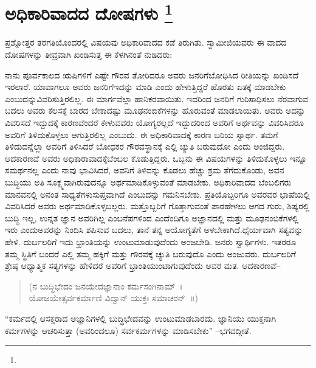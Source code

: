 
\chapter[ಅಧಿಕಾರಿವಾದದ ದೋಷಗಳು ]{ಅಧಿಕಾರಿವಾದದ ದೋಷಗಳು \protect\footnote{}}

ಪ್ರಶ್ನೋತ್ತರ ತರಗತಿಯೊಂದರಲ್ಲಿ ವಿಷಯವು ಅಧಿಕಾರಿವಾದದ ಕಡೆ ತಿರುಗಿತು. ಸ್ವಾಮೀಜಿಯವರು ಈ ವಾದದ ದೋಷಗಳನ್ನು ತೀವ್ರವಾಗಿ ಖಂಡಿಸುತ್ತ ಈ ಕೆಳಗಿನಂತೆ ನುಡಿದರು:

ನಾನು ಪೂರ್ವಕಾಲದ ಋಷಿಗಳಿಗೆ ಎಷ್ಟೇ ಗೌರವ ತೋರಿದರೂ ಅವರು ಜನರಿಗೆ\break ಬೋಧಿಸಿದ ರೀತಿಯನ್ನು ಖಂಡಿಸದೆ ಇರಲಾರೆ. ಯಾವಾಗಲೂ ಅವರು ಜನರಿಗೆ\break ಇದನ್ನು ಮಾಡಿ ಎಂದು ಹೇಳುತ್ತಿದ್ದರೆ ಹೊರತು ಏತಕ್ಕೆ ಮಾಡಬೇಕು ಎಂಬುದನ್ನು\break ವಿವರಿಸುತ್ತಿರಲಿಲ್ಲ. ಈ ಮಾರ್ಗವೆಲ್ಲಾ ಹಾನಿಕರವಾಯಿತು. ಇದರಿಂದ ಜನರಿಗೆ ಗುರಿ\break ಸಾಧಿಸಲು ನೆರವಾಗುವ ಬದಲು ಅವರು ಕೆಲಸಕ್ಕೆ ಬಾರದ ಬೇಕಾದಷ್ಟು ಮೂಢನಂಬಿಕೆಗಳನ್ನು ಹೊರುವಂತೆ ಮಾಡಲಾಯಿತು. ಅವರು ಅದನ್ನು ವಿವರಿಸದೆ ಇದ್ದುದಕ್ಕೆ ಕಾರಣವೆಂದರೆ ಕೇಳುವವರು ಯೋಗ್ಯರಲ್ಲದೆ ಇದ್ದುದರಿಂದ ಅವರಿಗೆ ಅರ್ಥವನ್ನು ವಿವರಿಸಿದರೂ ಅವರಿಗೆ ತಿಳಿದುಕೊಳ್ಳಲು ಆಗುತ್ತಿರಲಿಲ್ಲ ಎಂಬುದು. ಈ ಅಧಿಕಾರಿವಾದಕ್ಕೆ ಕಾರಣ ಬರಿಯ ಸ್ವಾರ್ಥ. ತಮಗೆ ತಿಳಿದುದನ್ನೆಲ್ಲಾ ಅವರಿಗೆ ತಿಳಿಸಿದರೆ ಬೋಧಕರ ಗೌರವಸ್ಥಾನಕ್ಕೆ ಎಲ್ಲಿ ಚ್ಯುತಿ ಬರುವುದೋ ಎಂದು ಅಂಜಿದ್ದರು. ಆದಕಾರಣವೆ ಅವರು ಅಧಿಕಾರಾವಾದಕ್ಕೆ\break ಬೆಂಬಲ ಕೊಡುತ್ತಿದ್ದರು. ಒಬ್ಬನು ಈ ವಿಷಯಗಳನ್ನು ತಿಳಿದುಕೊಳ್ಳಲು ಇನ್ನೂ ಸಮರ್ಥನಲ್ಲ ಎಂದು ನಾವು ಭಾವಿಸಿದರೆ, ಅವನಿಗೆ ತಿಳಿವನ್ನು ಕೊಡಲು ಹೆಚ್ಚು ಶ್ರಮ ತೆಗೆದುಕೊಂಡು, ಅವನ ಬುದ್ಧಿಯು ಅತಿ ಸೂಕ್ಷ್ಮವಾಗಿರುವುದನ್ನೂ ಅರ್ಥಮಾಡಿಕೊಳ್ಳುವಂತೆ ಮಾಡಬೇಕು. ಅಧಿಕಾರಿ\-ವಾದದ ಬೆಂಬಲಿಗರು ಮಾನವನಲ್ಲಿ ಅನಂತ ಸಾಧ್ಯತೆಗಳು\break ಸುಪ್ತವಾಗಿದೆ ಎಂಬುದನ್ನು ಗಮನಿಸಬೇಕು. ಪ್ರತಿಯೊಬ್ಬರಿಗೂ ಅವರವರ ಭಾಷೆಯಲ್ಲಿ ವಿವರಿಸಿದರೆ ಅವರು ಅರ್ಥಮಾಡಿಕೊಳ್ಳಬಲ್ಲರು. ಮತ್ತೊಬ್ಬರಿಗೆ ಗೊತ್ತಾಗುವಂತೆ ಪಾಠ\break ಹೇಳಲು ಆಗದ ಗುರು, ಶಿಷ್ಯರಲ್ಲಿ ಬುದ್ಧಿ ಇಲ್ಲ, ಉನ್ನತ ಜ್ಞಾನ ಅವರಿಗಿಲ್ಲ ಎಂಬ\break ನೆಪಗಳಿಂದ ಎಂದೆಂದಿಗೂ ಅಜ್ಞಾನದಲ್ಲಿ ಮತ್ತು ಮೂಢನಂಬಿಕೆಗಳಲ್ಲಿ ಇರು ಎಂದು\break ಅವರನ್ನು ನಿಂದಿಸಿ ಶಪಿಸುವ ಬದಲು, ತಾನೆ ತನ್ನ ಅಯೋಗ್ಯತೆಗೆ ಅಳಬೇಕಾಗಿದೆ.\break ಧೈರ್ಯವಾಗಿ ಸತ್ಯವನ್ನು ಹೇಳಿ. ದುರ್ಬಲರಿಗೆ ಇದು ಭ್ರಾಂತಿಯನ್ನು ಉಂಟುಮಾಡುವುದೆಂದು ಅಂಜಬೇಡಿ. ಜನರು ಸ್ವಾರ್ಥಿಗಳು. ಇತರರೂ ತಮ್ಮ ಸ್ಥಿತಿಗೆ ಬಂದರೆ ಎಲ್ಲಿ ತಮ್ಮ ಹಕ್ಕಿಗೆ ಮತ್ತು ಗೌರವಕ್ಕೆ ಚ್ಯುತಿ ಬರುವುದೊ ಎಂದು ಅಂಜುವರು. ದುರ್ಬಲರಿಗೆ ಶ್ರೇಷ್ಠ ಆಧ್ಯಾತ್ಮಿಕ ಸತ್ಯಗಳನ್ನು ಹೇಳಿದರೆ ಅವರಿಗೆ ಭ್ರಾಂತಿಯುಂಟಾಗುವುದೆಂದು ಅವರ ಮತ. ಆದಕಾರಣವೆ–

\begin{verse}
 (ನ ಬುದ್ಧಿಭೇದಂ ಜನಯೇದಜ್ಞಾನಾಂ ಕರ್ಮಸಂಗಿನಾಮ್​~।\\
 ಯೋಜಯೇತ್ಸರ್ವಕರ್ಮಾಣಿ ವಿದ್ವಾನ್​ ಯುಕ್ತಃ ಸಮಾಚರನ್​~॥)
\end{verse}

“ಕರ್ಮದಲ್ಲಿ ಆಸಕ್ತರಾದ ಅಜ್ಞಾನಿಗಳಲ್ಲಿ ಬುದ್ಧಿಭೇದವನ್ನು ಉಂಟುಮಾಡಬಾರದು. ಜ್ಞಾನಿಯು ಯುಕ್ತನಾಗಿ ಕರ್ಮಗಳನ್ನು ಆಚರಿಸುತ್ತಾ (ಅವರಿಂದಲೂ) ಸರ್ವಕರ್ಮಗಳನ್ನು ಮಾಡಿಸಬೇಕು” –ಭಗವದ್ಗೀತೆ.

